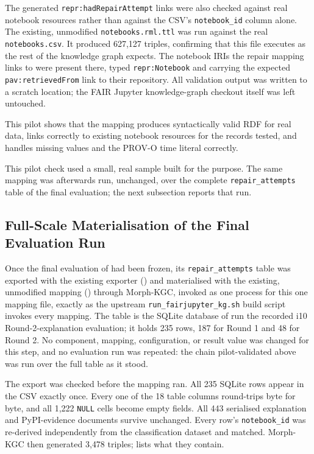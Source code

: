 The generated \texttt{repr:hadRepairAttempt} links were also checked
against real notebook resources rather than against the CSV's
\texttt{notebook\_id} column alone. The existing, unmodified
\texttt{notebooks.rml.ttl} was run against the real \texttt{notebooks.csv}.
It produced 627{,}127 triples, confirming that this file executes as the
rest of the knowledge graph expects. The notebook IRIs the repair mapping
links to were present there, typed \texttt{repr:Notebook} and carrying
the expected \texttt{pav:retrievedFrom} link to their repository. All
validation output was written to a scratch location; the FAIR Jupyter
knowledge-graph checkout itself was left untouched.

This pilot shows that the mapping produces syntactically valid RDF for
real data, links correctly to existing notebook resources for the
records tested, and handles missing values and the PROV-O time literal
correctly.

This pilot check used a small, real sample built for the purpose. The
same mapping was afterwards run, unchanged, over the complete
\texttt{repair\_attempts} table of the final evaluation; the next
subsection reports that run.

\iffalse
\subsection{Full-Scale Materialisation of the Final Evaluation Run}

\begin{sloppypar}
Once the final evaluation of  had been frozen, its
\texttt{repair\_attempts} table was exported with the existing exporter
() and materialised with the existing,
unmodified mapping () through Morph-KGC,
invoked as one process for this one mapping file, exactly as the upstream
\texttt{run\_fairjupyter\_kg.sh} build script invokes every mapping. The
table is the SQLite database of run
the recorded i10 Round-2-explanation evaluation; it holds
235 rows, 187 for Round 1 and 48 for Round 2. No component, mapping,
configuration, or result value was changed for this step, and no
evaluation run was repeated: the chain pilot-validated above was run over
the full table as it stood.
\end{sloppypar}

The export was checked before the mapping ran. All 235 SQLite rows appear
in the CSV exactly once. Every one of the 18 table columns round-trips
byte for byte, and all 1{,}222 \texttt{NULL} cells become empty fields.
All 443 serialised explanation and PyPI-evidence documents survive
unchanged. Every row's \texttt{notebook\_id} was re-derived independently
from the classification dataset and matched. Morph-KGC then generated
3{,}478 triples;  lists what they contain.

